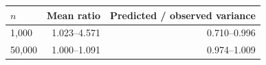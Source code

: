 \begin{tabular}{@{}lrr@{}}
\toprule
\(n\) & Mean ratio & Predicted / observed variance\\
\midrule
1,000 & 1.023--4.571 & 0.710--0.996\\
50,000 & 1.000--1.091 & 0.974--1.009\\
\bottomrule
\end{tabular}
